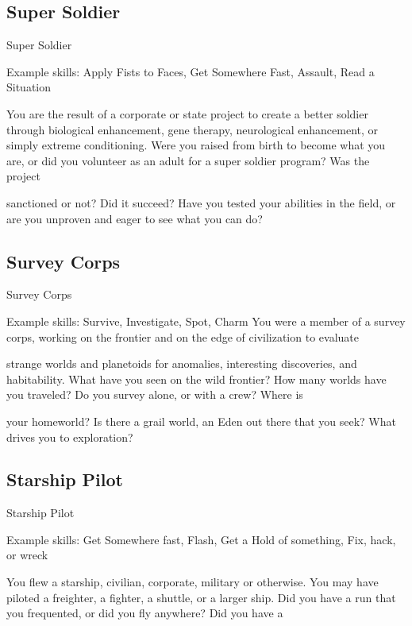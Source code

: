 \subsection{Super Soldier}
                                                 Super Soldier  

Example skills: Apply Fists to Faces, Get Somewhere Fast, Assault, Read a Situation  

You are the result of a corporate or state project to create a better soldier through biological enhancement,  
gene therapy, neurological enhancement, or simply extreme conditioning. Were you raised from birth to  
become what you are, or did you volunteer as an adult for a super soldier program? Was the project  

sanctioned or not? Did it succeed? Have you tested your abilities in the field, or are you unproven and  
eager to see what you can do?   

                                                                                                                      

\subsection{Survey Corps}
                                                 Survey Corps  

Example skills: Survive, Investigate, Spot, Charm  
You were a member of a survey corps, working on the frontier and on the edge of civilization to evaluate  

strange worlds and planetoids for anomalies, interesting discoveries, and habitability. What have you seen  
on the wild frontier? How many worlds have you traveled? Do you survey alone, or with a crew? Where is  

your homeworld? Is there a grail world, an Eden out there that you seek? What drives you to exploration?  
\subsection{Starship Pilot}
                                                 Starship Pilot  

Example skills: Get Somewhere fast, Flash, Get a Hold of something, Fix, hack, or wreck  

You flew a starship, civilian, corporate, military or otherwise. You may have piloted a freighter, a fighter, a  
shuttle, or a larger ship. Did you have a run that you frequented, or did you fly anywhere? Did you have a  

